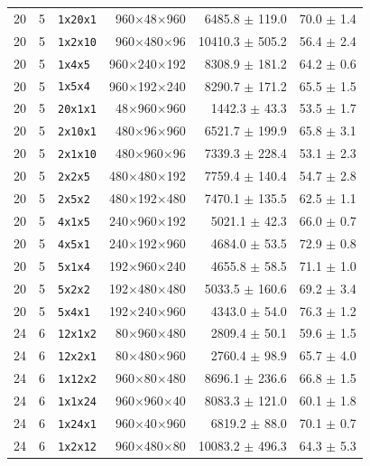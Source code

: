 \begin{longtable}{rrlrrr}
20 & 5 & \texttt{1x20x1} & 960$\times$48$\times$960 & 6485.8 $\pm$ 119.0 & 70.0 $\pm$ 1.4 \\
20 & 5 & \texttt{1x2x10} & 960$\times$480$\times$96 & 10410.3 $\pm$ 505.2 & 56.4 $\pm$ 2.4 \\
20 & 5 & \texttt{1x4x5} & 960$\times$240$\times$192 & 8308.9 $\pm$ 181.2 & 64.2 $\pm$ 0.6 \\
20 & 5 & \texttt{1x5x4} & 960$\times$192$\times$240 & 8290.7 $\pm$ 171.2 & 65.5 $\pm$ 1.5 \\
20 & 5 & \texttt{20x1x1} & 48$\times$960$\times$960 & 1442.3 $\pm$ 43.3 & 53.5 $\pm$ 1.7 \\
20 & 5 & \texttt{2x10x1} & 480$\times$96$\times$960 & 6521.7 $\pm$ 199.9 & 65.8 $\pm$ 3.1 \\
20 & 5 & \texttt{2x1x10} & 480$\times$960$\times$96 & 7339.3 $\pm$ 228.4 & 53.1 $\pm$ 2.3 \\
20 & 5 & \texttt{2x2x5} & 480$\times$480$\times$192 & 7759.4 $\pm$ 140.4 & 54.7 $\pm$ 2.8 \\
20 & 5 & \texttt{2x5x2} & 480$\times$192$\times$480 & 7470.1 $\pm$ 135.5 & 62.5 $\pm$ 1.1 \\
20 & 5 & \texttt{4x1x5} & 240$\times$960$\times$192 & 5021.1 $\pm$ 42.3 & 66.0 $\pm$ 0.7 \\
20 & 5 & \texttt{4x5x1} & 240$\times$192$\times$960 & 4684.0 $\pm$ 53.5 & 72.9 $\pm$ 0.8 \\
20 & 5 & \texttt{5x1x4} & 192$\times$960$\times$240 & 4655.8 $\pm$ 58.5 & 71.1 $\pm$ 1.0 \\
20 & 5 & \texttt{5x2x2} & 192$\times$480$\times$480 & 5033.5 $\pm$ 160.6 & 69.2 $\pm$ 3.4 \\
20 & 5 & \texttt{5x4x1} & 192$\times$240$\times$960 & 4343.0 $\pm$ 54.0 & 76.3 $\pm$ 1.2 \\
24 & 6 & \texttt{12x1x2} & 80$\times$960$\times$480 & 2809.4 $\pm$ 50.1 & 59.6 $\pm$ 1.5 \\
24 & 6 & \texttt{12x2x1} & 80$\times$480$\times$960 & 2760.4 $\pm$ 98.9 & 65.7 $\pm$ 4.0 \\
24 & 6 & \texttt{1x12x2} & 960$\times$80$\times$480 & 8696.1 $\pm$ 236.6 & 66.8 $\pm$ 1.5 \\
24 & 6 & \texttt{1x1x24} & 960$\times$960$\times$40 & 8083.3 $\pm$ 121.0 & 60.1 $\pm$ 1.8 \\
24 & 6 & \texttt{1x24x1} & 960$\times$40$\times$960 & 6819.2 $\pm$ 88.0 & 70.1 $\pm$ 0.7 \\
24 & 6 & \texttt{1x2x12} & 960$\times$480$\times$80 & 10083.2 $\pm$ 496.3 & 64.3 $\pm$ 5.3 \\

\end{longtable}
